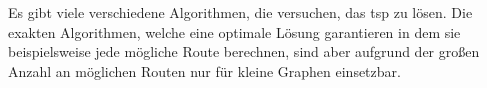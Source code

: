 \noindent Es gibt viele verschiedene Algorithmen, die versuchen, das \acs*{tsp} zu lösen.
Die exakten Algorithmen, welche eine optimale Lösung garantieren in dem sie beispielsweise jede mögliche Route berechnen, sind aber aufgrund der großen Anzahl an möglichen Routen nur für kleine Graphen einsetzbar.


